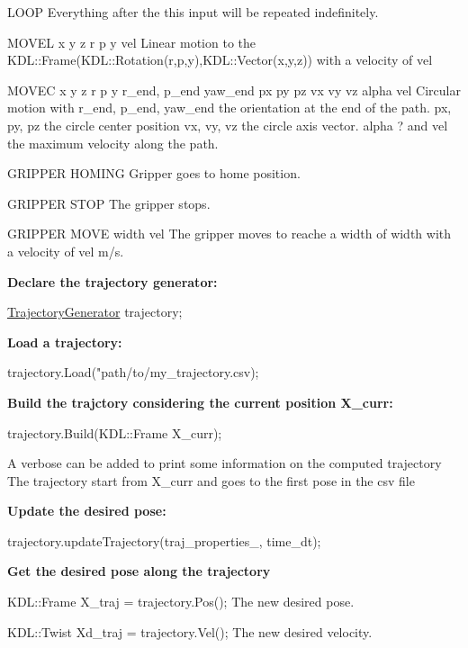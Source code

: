 {\ttfamily L\+O\+OP} Everything after the this input will be repeated indefinitely.

{\ttfamily M\+O\+V\+EL x y z r p y vel} Linear motion to the K\+D\+L\+::\+Frame(K\+D\+L\+::\+Rotation({\ttfamily r},{\ttfamily p},{\ttfamily y}),K\+D\+L\+::\+Vector({\ttfamily x},{\ttfamily y},{\ttfamily z})) with a velocity of {\ttfamily vel}

{\ttfamily M\+O\+V\+EC x y z r p y r\+\_\+end, p\+\_\+end yaw\+\_\+end px py pz vx vy vz alpha vel} Circular motion with {\ttfamily r\+\_\+end, p\+\_\+end, yaw\+\_\+end} the orientation at the end of the path. {\ttfamily px, py, pz} the circle center position {\ttfamily vx, vy, vz} the circle axis vector. {\ttfamily alpha} ? and {\ttfamily vel} the maximum velocity along the path.

{\ttfamily G\+R\+I\+P\+P\+ER H\+O\+M\+I\+NG} Gripper goes to home position.

{\ttfamily G\+R\+I\+P\+P\+ER S\+T\+OP} The gripper stops.

{\ttfamily G\+R\+I\+P\+P\+ER M\+O\+VE width vel} The gripper moves to reache a width of {\ttfamily width} with a velocity of {\ttfamily vel} m/s.

{\bfseries Declare the trajectory generator\+:}

{\ttfamily \hyperlink{class_trajectory_generator}{Trajectory\+Generator} trajectory;}

{\bfseries Load a trajectory\+:}

{\ttfamily trajectory.\+Load("path/to/my\+\_\+trajectory.\+csv);}

{\bfseries Build the trajctory considering the current position X\+\_\+curr\+:}

{\ttfamily trajectory.\+Build(\+K\+D\+L\+::\+Frame X\+\_\+curr);}

A verbose can be added to print some information on the computed trajectory The trajectory start from X\+\_\+curr and goes to the first pose in the csv file

{\bfseries Update the desired pose\+:}

{\ttfamily trajectory.\+update\+Trajectory(traj\+\_\+properties\+\_\+, time\+\_\+dt);}

{\bfseries Get the desired pose along the trajectory}

{\ttfamily K\+D\+L\+::\+Frame X\+\_\+traj = trajectory.\+Pos();} The new desired pose.

{\ttfamily K\+D\+L\+::\+Twist Xd\+\_\+traj = trajectory.\+Vel();} The new desired velocity.

